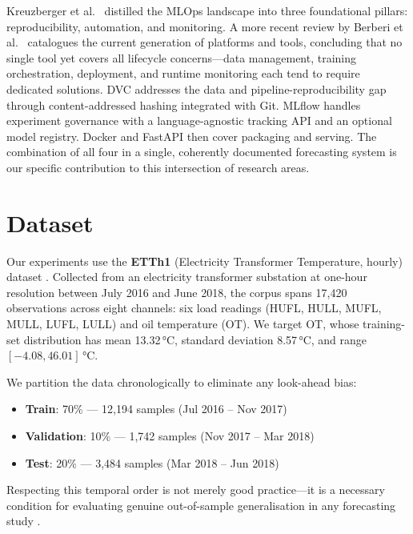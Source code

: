 \documentclass[conference]{IEEEtran}
\begin{document}
  Kreuzberger et al.\ \cite{kreuzberger2023mlops} distilled the MLOps landscape into
  three foundational pillars: reproducibility, automation, and monitoring. A more recent
  review by Berberi et al.\ \cite{berberi2025mlops} catalogues the current generation
  of platforms and tools, concluding that no single tool yet covers all lifecycle
  concerns---data management, training orchestration, deployment, and runtime monitoring
  each tend to require dedicated solutions. DVC \cite{dvc2020} addresses the data and
  pipeline-reproducibility gap through content-addressed hashing integrated with Git.
  MLflow \cite{mlflow2018} handles experiment governance with a language-agnostic
  tracking API and an optional model registry. Docker \cite{docker2013} and FastAPI
  \cite{fastapi2018} then cover packaging and serving. The combination of all four
  in a single, coherently documented forecasting system is our specific contribution
  to this intersection of research areas.

  \section{Dataset}

  Our experiments use the \textbf{ETTh1} (Electricity Transformer Temperature,
  hourly) dataset \cite{zhou2021informer}. Collected from an electricity transformer
  substation at one-hour resolution between July 2016 and June 2018, the corpus spans
  17,420 observations across eight channels: six load readings (HUFL, HULL, MUFL,
  MULL, LUFL, LULL) and oil temperature (OT). We target OT, whose training-set
  distribution has mean 13.32\,°C, standard deviation 8.57\,°C, and range $[-4.08,
  46.01]$\,°C.

  We partition the data chronologically to eliminate any look-ahead bias:
  \begin{itemize}
    \item \textbf{Train}: 70\% --- 12,194 samples (Jul 2016 -- Nov 2017)
    \item \textbf{Validation}: 10\% --- 1,742 samples (Nov 2017 -- Mar 2018)
    \item \textbf{Test}: 20\% --- 3,484 samples (Mar 2018 -- Jun 2018)
  \end{itemize}
  Respecting this temporal order is not merely good practice---it is a necessary
  condition for evaluating genuine out-of-sample generalisation in any forecasting
  study \cite{hyndman2018forecasting}.
\end{document}
